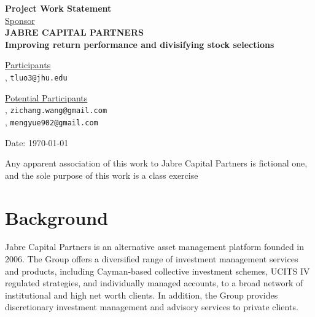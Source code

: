 \documentclass[12pt,letterpaper]{article}
\theoremstyle{definition}
\begin{document}
\def\shiftdowna{0.32in}  %
\def\shiftdownb{0.22in}  %



\begin{center}
\textbf{{\large Project Work Statement}}\\


\vspace \shiftdowna
\underline {Sponsor}\\ 
\vspace{5pt}
\textbf{{\large JABRE CAPITAL PARTNERS}}\\


\vspace \shiftdowna
\textbf{{\large Improving return performance and divisifying stock selections}}


\vspace{0.35in}
\vspace \shiftdownb
\underline {Participants} \\
\vspace{5pt}
, \texttt{tluo3@jhu.edu}

\vspace \shiftdownb
\underline {Potential Participants}\\
\vspace{5pt}
, \texttt{zichang.wang@gmail.com} \\
\vspace{3pt}
, \texttt{mengyue902@gmail.com} \\
\vspace{3pt}

\vspace \shiftdowna
Date: \today

\end{center}

\vfill  
\footnoterule
\noindent \small{Any apparent association of this work to Jabre Capital Partners is
fictional one, and the sole purpose of this work is a class exercise}

\newpage

\section{Background} 
Jabre Capital Partners is an alternative asset management platform founded in 2006. The Group offers a diversified range of investment management services and products, including Cayman-based collective investment schemes, UCITS IV regulated strategies, and individually managed accounts, to a broad network of institutional and high net worth clients. In addition, the Group provides discretionary investment management and advisory services to private clients.
\end{document}
